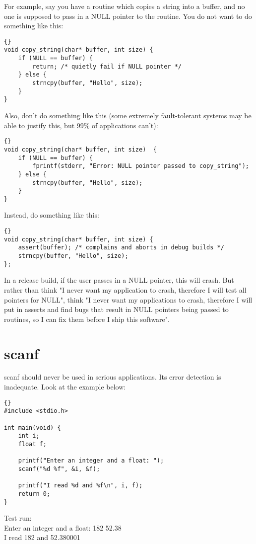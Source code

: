 \documentclass{report}
\begin{document}
For example, say you have a routine which copies a string into a buffer, and no one is supposed to pass in a NULL pointer to the routine. You do not want to do something like this: 
\begin{lstlisting}{}
void copy_string(char* buffer, int size) { 
    if (NULL == buffer) {
        return; /* quietly fail if NULL pointer */
    } else { 
        strncpy(buffer, "Hello", size); 
    } 
} 
\end{lstlisting}
Also, don't do something like this (some extremely fault-tolerant systems may be able to justify this, but 99\% of applications can't): 
\begin{lstlisting}{}
void copy_string(char* buffer, int size)  { 
    if (NULL == buffer) { 
        fprintf(stderr, "Error: NULL pointer passed to copy_string"); 
    } else { 
        strncpy(buffer, "Hello", size); 
    } 
} 
\end{lstlisting}
Instead, do something like this: 
\begin{lstlisting}{}
void copy_string(char* buffer, int size) { 
    assert(buffer); /* complains and aborts in debug builds */
    strncpy(buffer, "Hello", size); 
}; 
\end{lstlisting}
In a release build, if the user passes in a NULL pointer, this will crash.
But rather than think "I never want my application to crash, therefore I will test all pointers for NULL", think "I never want my applications to crash, therefore I will put in asserts and find bugs that result in NULL pointers being passed to routines, so I can fix them before I ship this software".

\section{scanf} 
scanf should never be used in serious applications. Its error detection is inadequate. Look at the example below: 
\begin{lstlisting}{}
#include <stdio.h>

int main(void) {
    int i;
    float f;
    
    printf("Enter an integer and a float: ");
    scanf("%d %f", &i, &f);
    
    printf("I read %d and %f\n", i, f);
    return 0;
}
\end{lstlisting}
 
Test run:\\ 
Enter an integer and a float: 182 52.38\\
I read 182 and 52.380001\\
\end{document}
